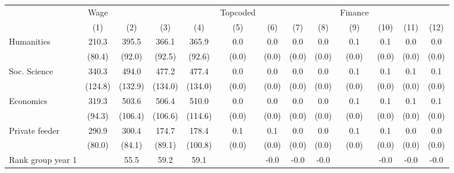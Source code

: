 \begin{tabular}{l*{12}{c}}
\toprule
                    &        Wage&            &            &            &    Topcoded&            &            &            &     Finance&            &            &            \\
                    &\multicolumn{1}{c}{(1)}&\multicolumn{1}{c}{(2)}&\multicolumn{1}{c}{(3)}&\multicolumn{1}{c}{(4)}&\multicolumn{1}{c}{(5)}&\multicolumn{1}{c}{(6)}&\multicolumn{1}{c}{(7)}&\multicolumn{1}{c}{(8)}&\multicolumn{1}{c}{(9)}&\multicolumn{1}{c}{(10)}&\multicolumn{1}{c}{(11)}&\multicolumn{1}{c}{(12)}\\
\midrule
Humanities          &       210.3&       395.5&       366.1&       365.9&         0.0&         0.0&         0.0&         0.0&         0.1&         0.1&         0.0&         0.0\\
                    &      (80.4)&      (92.0)&      (92.5)&      (92.6)&       (0.0)&       (0.0)&       (0.0)&       (0.0)&       (0.0)&       (0.0)&       (0.0)&       (0.0)\\
\addlinespace
Soc. Science        &       340.3&       494.0&       477.2&       477.4&         0.0&         0.0&         0.0&         0.0&         0.1&         0.1&         0.1&         0.1\\
                    &     (124.8)&     (132.9)&     (134.0)&     (134.0)&       (0.0)&       (0.0)&       (0.0)&       (0.0)&       (0.0)&       (0.0)&       (0.0)&       (0.0)\\
\addlinespace
Economics           &       319.3&       503.6&       506.4&       510.0&         0.0&         0.0&         0.0&         0.0&         0.1&         0.1&         0.1&         0.1\\
                    &      (94.3)&     (106.4)&     (106.6)&     (114.6)&       (0.0)&       (0.0)&       (0.0)&       (0.0)&       (0.0)&       (0.0)&       (0.0)&       (0.0)\\
\addlinespace
Private feeder      &       290.9&       300.4&       174.7&       178.4&         0.1&         0.1&         0.0&         0.0&         0.1&         0.1&         0.0&         0.0\\
                    &      (80.0)&      (84.1)&      (89.1)&     (100.8)&       (0.0)&       (0.0)&       (0.0)&       (0.0)&       (0.0)&       (0.0)&       (0.0)&       (0.0)\\
\addlinespace
Rank group year 1   &            &        55.5&        59.2&        59.1&            &        -0.0&        -0.0&        -0.0&            &        -0.0&        -0.0&        -0.0\\

\end{tabular}

